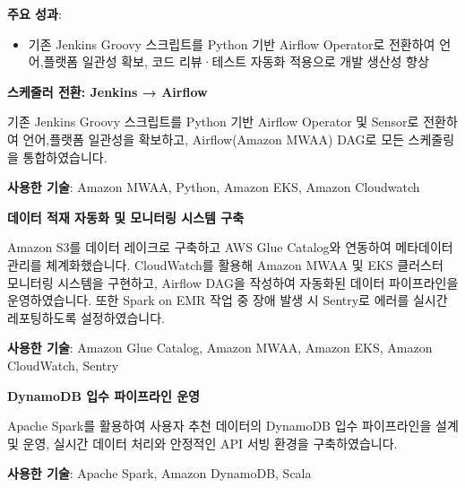 \documentclass[letterpaper,11pt]{article}
\newcommand{\resumeSubProject}[2]{
  \item{
    {#1 \vspace{0pt}}
    {#2}
  }
}
\begin{document}
{\begin{figure}[ht]
{
}
\end{figure}

    \vspace{3mm}
    
    \textbf{주요 성과}:
        \begin{itemize}
            \item 기존 Jenkins Groovy 스크립트를 Python 기반 Airflow Operator로 전환하여 언어,플랫폼 일관성 확보, 코드 리뷰·테스트 자동화 적용으로 개발 생산성 향상
        \end{itemize}
    
    }
    \resumeSubProject{\textbf{스케줄러 전환: Jenkins → Airflow}}
    {
    
    기존 Jenkins Groovy 스크립트를 Python 기반 Airflow Operator 및 Sensor로 전환하여  
    언어,플랫폼 일관성을 확보하고, Airflow(Amazon MWAA) DAG로 모든 스케줄링을 통합하였습니다.
        \vspace{1mm}
        
        \textbf{사용한 기술}: Amazon MWAA, Python, Amazon EKS, Amazon Cloudwatch
        \vspace{2mm}
    }
    
    \resumeSubProject{\textbf{데이터 적재 자동화 및 모니터링 시스템 구축}}
    {
    
    Amazon S3를 데이터 레이크로 구축하고 AWS Glue Catalog와 연동하여 메타데이터 관리를 체계화했습니다. CloudWatch를 활용해 Amazon MWAA 및 EKS 클러스터 모니터링 시스템을 구현하고, Airflow DAG을 작성하여 자동화된 데이터 파이프라인을 운영하였습니다. 또한 Spark on EMR 작업 중 장애 발생 시 Sentry로 에러를 실시간 레포팅하도록 설정하였습니다.  

        \vspace{1mm}
        \textbf{사용한 기술}: Amazon Glue Catalog, Amazon MWAA, Amazon EKS, Amazon CloudWatch, Sentry 
        \vspace{2mm}
    }
    
    \resumeSubProject{\textbf{DynamoDB 입수 파이프라인 운영}}
    {
    
    Apache Spark를 활용하여 사용자 추천 데이터의 DynamoDB 입수 파이프라인을 설계 및 운영, 실시간 데이터 처리와 안정적인 API 서빙 환경을 구축하였습니다.

    \vspace{1mm}
    \textbf{사용한 기술}: Apache Spark, Amazon DynamoDB, Scala
    \vspace{2mm}
    }
\end{document}
